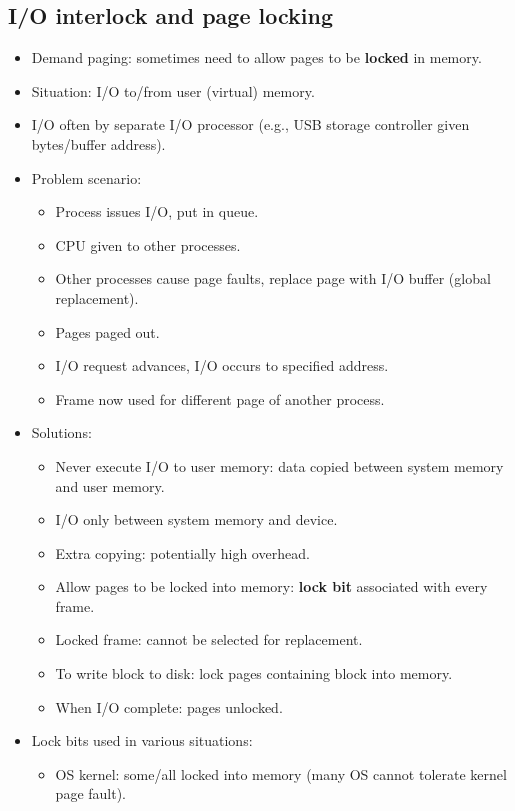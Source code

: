 \subsection{I/O interlock and page locking}
\begin{itemize}
    \item Demand paging: sometimes need to allow pages to be \textbf{locked} in memory.
    \item Situation: I/O to/from user (virtual) memory.
    \item I/O often by separate I/O processor (e.g., USB storage controller given bytes/buffer address).
    \item Problem scenario:
    \begin{itemize}
        \item Process issues I/O, put in queue.
        \item CPU given to other processes.
        \item Other processes cause page faults, replace page with I/O buffer (global replacement).
        \item Pages paged out.
        \item I/O request advances, I/O occurs to specified address.
        \item Frame now used for different page of another process.
    \end{itemize}
    \item Solutions:
    \begin{itemize}
        \item Never execute I/O to user memory: data copied between system memory and user memory.
        \item I/O only between system memory and device.
        \item Extra copying: potentially high overhead.
        \item Allow pages to be locked into memory: \textbf{lock bit} associated with every frame.
        \item Locked frame: cannot be selected for replacement.
        \item To write block to disk: lock pages containing block into memory.
        \item When I/O complete: pages unlocked.
    \end{itemize}
    \item Lock bits used in various situations:
    \begin{itemize}
        \item OS kernel: some/all locked into memory (many OS cannot tolerate kernel page fault).

\end{itemize}
\end{itemize}
